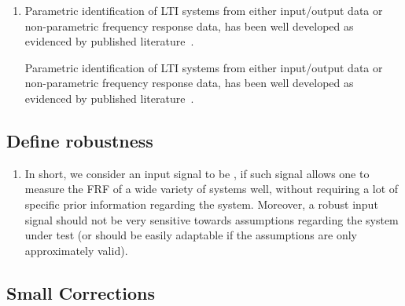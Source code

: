 \documentclass{responseletter}
\begin{document}
\begin{enumerate}
\item 
{}
\begin{oldquote}
Parametric identification of \gls{LTI} systems from either input/output data or non-parametric frequency response data, has been well developed as evidenced by published literature~\citep{Pintelon2012,Ljung1999,Schoukens1999,Pintelon1998}.
\end{oldquote}
\begin{newquote}
Parametric identification of \gls{LTI} systems from either input/output data or non-parametric frequency response data, has been well developed as evidenced by published literature~\citep{Pintelon2012,Ljung1999,Schoukens1999,Pintelon1998,Soderstrom1989,Goodwin1977,Brillinger1981,Sanathanan1963,McKelvey2002,}.
\end{newquote}
\end{enumerate}


\subsection{Define robustness}

\begin{enumerate}
  \item {}
  \begin{newquote}
  In short, we consider an input signal to be , if such signal allows one to measure the \gls{FRF} of a wide variety of systems well, without requiring a lot of specific prior information regarding the system.
Moreover, a robust input signal should not be very sensitive towards assumptions regarding the system under test (or should be easily adaptable if the assumptions are only approximately valid).
  \end{newquote}
\end{enumerate}

\subsection{Small Corrections}
\end{document}
